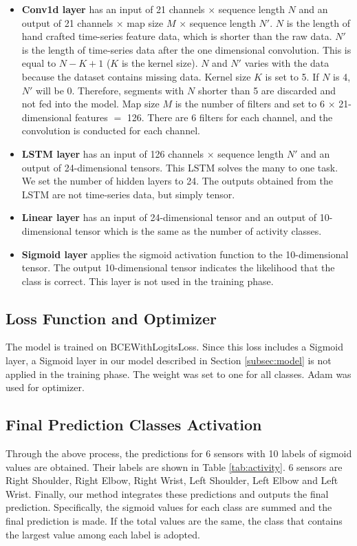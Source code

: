 \documentclass[graybox]{svmult}
\begin{document}
\begin{itemize}
    \item {\bf Conv1d layer} has an input of 21 channels $\times$ sequence length $N$ and an output of 21 channels $\times$ map size $M$ $\times$ sequence length $N'$. $N$ is the length of hand crafted time-series feature data, which is shorter than the raw data. $N'$ is the length of time-series data after the one dimensional convolution. This is equal to $N-K+1$ ($K$ is the kernel size). $N$ and $N'$ varies with the data because the dataset contains missing data. Kernel size $K$ is set to 5. If $N$ is 4, $N'$ will be 0. Therefore, segments with $N$ shorter than 5 are discarded and not fed into the model. Map size $M$ is the number of filters and set to 6 $\times$ 21-dimensional features $=$ 126. There are 6 filters for each channel, and the convolution is conducted for each channel.
    
    \item {\bf LSTM layer} has an input of 126 channels $\times$ sequence length $N'$ and an output of 24-dimensional tensors. This LSTM solves the many to one task. We set the number of hidden layers to 24. The outputs obtained from the LSTM are not time-series data, but simply tensor.
    
    \item {\bf Linear layer} has an input of 24-dimensional tensor and an output of 10-dimensional tensor which is the same as the number of activity classes.
    
    \item {\bf Sigmoid layer} applies the sigmoid activation function to the 10-dimensional tensor. The output 10-dimensional tensor indicates the likelihood that the class is correct. This layer is not used in the training phase.
\end{itemize}



\subsection{Loss Function and Optimizer}
The model is trained on BCEWithLogitsLoss. Since this loss includes a Sigmoid layer, a Sigmoid layer in our model described in Section \ref{subsec:model} is not applied in the training phase. The weight was set to one for all classes. Adam was used for optimizer.



\subsection{Final Prediction Classes Activation}
Through the above process, the predictions for 6 sensors with 10 labels of sigmoid values are obtained. Their labels are shown in Table \ref{tab:activity}. 6 sensors are Right Shoulder, Right Elbow, Right Wrist, Left Shoulder, Left Elbow and Left Wrist. Finally, our method integrates these predictions and outputs the final prediction.
Specifically, the sigmoid values for each class are summed and the final prediction is made. If the total values are the same, the class that contains the largest value among each label is adopted.
\end{document}
